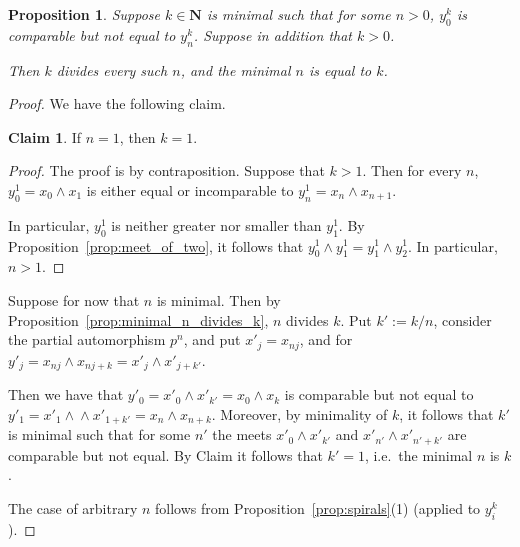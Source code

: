 \documentclass[final,a4paper,12pt,reqno]{amsart}
\newcommand{\bN}{{\mathbf{N}}}
\newcommand{\meet}{\mathop{\wedge}}
\newtheorem{prop}[thm]{Proposition}
\theoremstyle{remark}
\theoremstyle{definition}
\newtheorem*{clm*}{Claim}
\let \geq \geqslant
\begin{document}
	\begin{prop}
		\label{prop:comb_minimal_n}
		Suppose $k\in \bN$ is minimal such that for some $n>0$, $y^k_0$ is comparable but not equal to $y^k_n$. Suppose in addition that $k>0$.
		
		Then $k$ divides every such $n$, and the minimal $n$ is equal to $k$.
	\end{prop}
	\begin{proof}
		We have the following claim.
		
		\begin{clm*}
			If $n=1$, then $k=1$.
		\end{clm*}
		\begin{proof}
			The proof is by contraposition. Suppose that $k>1$. Then for every $n$, $y^1_0=x_0\meet x_1$ is either equal or incomparable to $y^1_n=x_n\meet x_{n+1}$.
			
			In particular, $y^1_0$ is neither greater nor smaller than $y^1_1$. By Proposition~\ref{prop:meet_of_two}, it follows that $y^1_0\meet y^1_1=y^1_1\meet y^1_2$. In particular, $n>1$.
%			
		\end{proof}
		
		Suppose for now that $n$ is minimal. Then by Proposition~\ref{prop:minimal_n_divides_k}, $n$ divides $k$. Put $k':=k/n$, consider the partial automorphism $p^n$, and put $x'_j=x_{nj}$, and for $y'_j=x_{nj}\meet x_{nj+k}=x'_j\meet x'_{j+k'}$.
		
		Then we have that $y'_0=x'_0\meet x'_{k'}=x_0\meet x_{k}$ is comparable but not equal to $y'_1=x'_1\meet \meet x'_{1+k'}=x_n\meet x_{n+k}$. Moreover, by minimality of $k$, it follows that $k'$ is minimal such that for some $n'$ the meets $x'_{0}\meet x'_{k'}$ and $x'_{n'}\meet x'_{n'+k'}$ are comparable but not equal. By Claim it follows that $k'=1$, i.e.\ the minimal $n$ is $k$.
		
		The case of arbitrary $n$ follows from Proposition~\ref{prop:spirals}(1) (applied to $y^k_i$).
	\end{proof}
	
\end{document}
